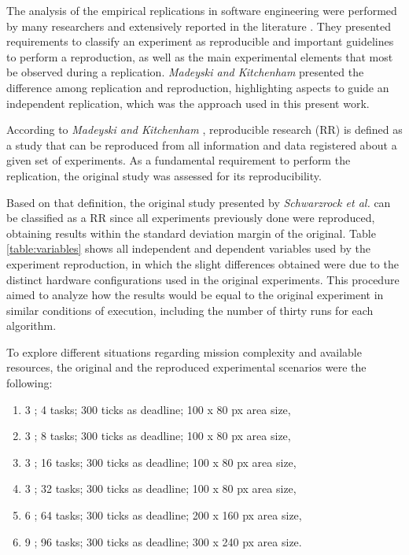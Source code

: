The analysis of the empirical replications in software engineering were performed by many researchers and extensively reported in the literature \cite{exp05, exp04, exp03, exp01}. They presented requirements to classify an experiment as reproducible and important guidelines to perform a reproduction, as well as the main experimental elements that most be observed during a replication. \textit{Madeyski and Kitchenham} \cite{exp02} presented the difference among replication and reproduction, highlighting aspects to guide an independent replication, which was the approach used in this present work.

According to \textit{Madeyski and Kitchenham} \cite{exp02}, reproducible research (RR) is defined as a study that can be reproduced from all information and data registered about a given set of experiments. As a fundamental requirement to perform the replication, the original study was assessed for its reproducibility.

Based on that definition, the original study presented by \textit{Schwarzrock et al.} \cite{MAS07} can be classified as a RR since all experiments previously done were reproduced, obtaining results within the standard deviation margin of the original. Table \ref{table:variables} shows all independent and dependent variables used by the experiment reproduction, in which the slight differences obtained were due to the distinct hardware configurations used in the original experiments. This procedure aimed to analyze how the results would be equal to the original experiment in similar conditions of execution, including the number of thirty runs for each algorithm.

To explore different situations regarding mission complexity and available resources, the original and the reproduced experimental scenarios were the following:

\begin{enumerate}
	\item 3 \uavs; 4 tasks; 300 ticks as deadline; 100 x 80 px area size, \label{case:4tasks}
	\item 3 \uavs; 8 tasks; 300 ticks as deadline; 100 x 80 px area size, \label{case:8tasks}
	\item 3 \uavs; 16 tasks; 300 ticks as deadline; 100 x 80 px area size, \label{case:16tasks}
	\item 3 \uavs; 32 tasks; 300 ticks as deadline; 100 x 80 px area size, \label{case:32tasks}
	\item 6 \uavs; 64 tasks; 300 ticks as deadline; 200 x 160 px area size, \label{case:64tasks}
	\item 9 \uavs; 96 tasks; 300 ticks as deadline; 300 x 240 px area size. \label{case:96tasks}
\end{enumerate}

